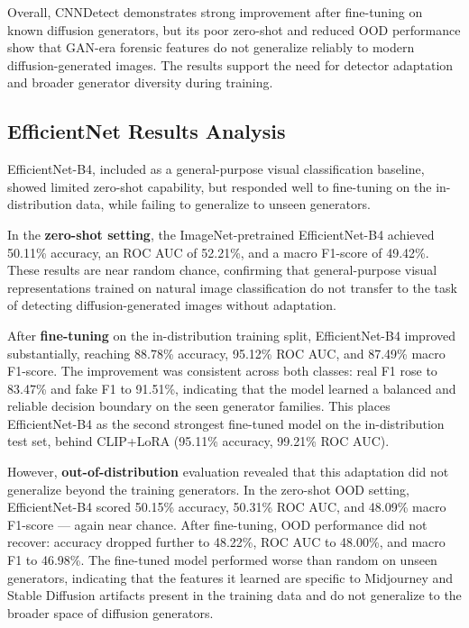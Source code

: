 Overall, CNNDetect demonstrates strong improvement after fine-tuning on known diffusion generators, but its poor zero-shot and reduced OOD performance show that GAN-era forensic features do not generalize reliably to modern diffusion-generated images. The results support the need for detector adaptation and broader generator diversity during training.

\subsection{EfficientNet Results Analysis}

EfficientNet-B4, included as a general-purpose visual classification baseline, showed limited zero-shot capability, but responded well to fine-tuning on the in-distribution data, while failing to generalize to unseen generators.
 
In the \textbf{zero-shot setting}, the ImageNet-pretrained EfficientNet-B4 achieved 50.11\% accuracy, an ROC AUC of 52.21\%, and a macro F1-score of 49.42\%. These results are near random chance, confirming that general-purpose visual representations trained on natural image classification do not transfer to the task of detecting diffusion-generated images without adaptation. 


After \textbf{fine-tuning} on the in-distribution training split, EfficientNet-B4 improved substantially, reaching 88.78\% accuracy, 95.12\% ROC AUC, and 87.49\% macro F1-score. The improvement was consistent across both classes: real F1 rose to 83.47\% and fake F1 to 91.51\%, indicating that the model learned a balanced and reliable decision boundary on the seen generator families. This places EfficientNet-B4 as the second strongest fine-tuned model on the in-distribution test set, behind CLIP+LoRA (95.11\% accuracy, 99.21\% ROC AUC).
 
However, \textbf{out-of-distribution} evaluation revealed that this adaptation did not generalize beyond the training generators. In the zero-shot OOD setting, EfficientNet-B4 scored 50.15\% accuracy, 50.31\% ROC AUC, and 48.09\% macro F1-score — again near chance. After fine-tuning, OOD performance did not recover: accuracy dropped further to 48.22\%, ROC AUC to 48.00\%, and macro F1 to 46.98\%. The fine-tuned model performed worse than random on unseen generators, indicating that the features it learned are specific to Midjourney and Stable Diffusion artifacts present in the training data and do not generalize to the broader space of diffusion generators.



